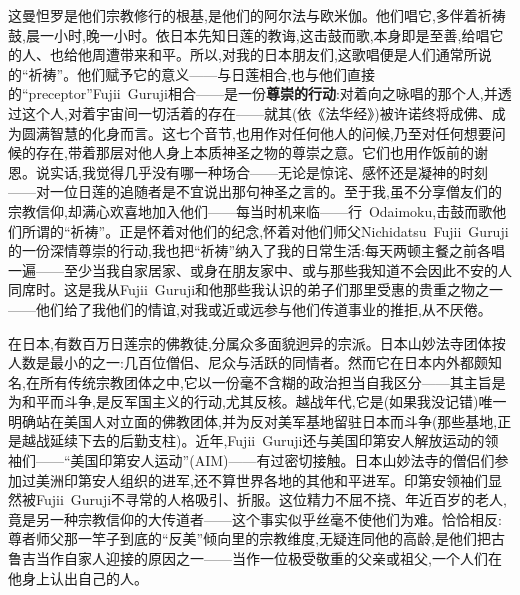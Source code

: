 这曼怛罗是他们宗教修行的根基,是他们的阿尔法与欧米伽。他们唱它,多伴着祈祷鼓,晨一小时,晚一小时。依日本先知日莲的教诲,这击鼓而歌,本身即是至善,给唱它的人、也给他周遭带来和平。所以,对我\dmark{}的日本朋友们,这歌唱便是人们通常所说的“祈祷”。他们赋予它的意义——与日莲相合,也与他们直接的“preceptor”Fujii~Guruji相合——是一份\textbf{尊崇的行动}:对着向之咏唱的那个人,并透过这个人,对着宇宙间一切活着的存在——就其(依《法华经》)被许诺终将成佛、成为圆满智慧的化身而言。这七个音节,也用作对任何他人的问候,乃至对任何想要问候的存在,带着那层对他人身上本质神圣之物的尊崇之意。它们也用作饭前的谢恩。说实话,我觉得几乎没有哪一种场合——无论是惊诧、感怀还是凝神的时刻——对一位日莲的追随者是不宜说出那句神圣之言的。至于我,虽不分享僧友们的宗教信仰,却满心欢喜地加入他们——每当时机来临——行~Odaimoku,击鼓而歌他们所谓的“祈祷”。正是怀着对他们的纪念,怀着对他们师父Nichidatsu~Fujii~Guruji的一份深情尊崇的行动,我也把“祈祷”纳入了我的日常生活:每天两顿主餐之前各唱一遍——至少当我自家居家、或身在朋友家中、或与那些我知道不会因此不安的人同席时。这是我从Fujii~Guruji和他那些我认识的弟子们那里受惠的贵重之物之一——他们给了我他们的情谊,对我或近或远参与他们传道事业的推拒,从不厌倦。

在日本,有数百万日莲宗的佛教徒,分属众多面貌迥异的宗派。日本山妙法寺团体按人数是最小的之一:几百位僧侣、尼众与活跃的同情者。然而它在日本内外都颇知名,在所有传统宗教团体之中,它以一份毫不含糊的政治担当自我区分\dmark{}——其主旨是为和平而斗争,是反军国主义的行动,尤其反核。越战年代,它是(如果我没记错)唯一明确站在美国人对立面的佛教团体,并为反对美军基地留驻日本而斗争(那些基地,正是越战延续下去的后勤支柱)。近年,Fujii~Guruji还与美国印第安人解放运动的领袖们——“美国印第安人运动”(AIM)——有过密切接触。日本山妙法寺的僧侣们参加过美洲印第安人组织的进军,还不算世界各地的其他和平进军。印第安领袖们显然被Fujii~Guruji不寻常的人格吸引、折服。这位精力不屈不挠、年近百岁的老人,竟是另一种宗教信仰的大传道者——这个事实似乎丝毫不使他们为难。恰恰相反:尊者师父那一竿子到底的“反美”倾向里的宗教维度,无疑连同他的高龄,是他们把古鲁吉当作自家人迎接的原因之一——当作一位极受敬重的父亲或祖父,一个人们在他身上认出自己的人。

